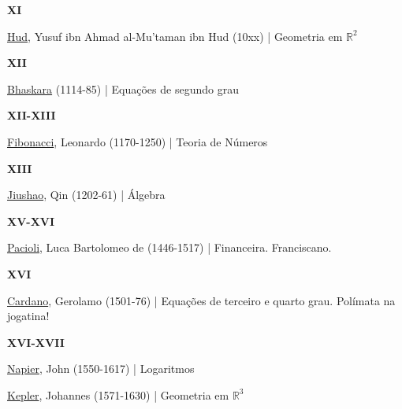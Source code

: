 \documentclass[12pt,a4paper]{article}
\begin{document}
			\textbf{XI}

			\href{http://en.wikipedia.org/wiki/Yusuf_al-Mu\%27taman_ibn_Hud}{Hud}, Yusuf ibn Ahmad al-Mu'taman ibn Hud (10xx) | Geometria em $ \mathbb{R}^2 $

			\begin{flushright}
			\end{flushright}

			\textbf{XII}

			\href{http://pt.wikipedia.org/wiki/Bhaskara}{Bhaskara} (1114-85) | Equa\c{c}\~oes de segundo grau

			\begin{flushright}
			\end{flushright}

			\textbf{XII-XIII}

			\href{http://pt.wikipedia.org/wiki/Leonardo_Fibonacci}{Fibonacci}, Leonardo (1170-1250) | Teoria de N\'umeros

			\begin{flushright}
			\end{flushright}

			\textbf{XIII}

			\href{http://en.wikipedia.org/wiki/Qin_Jiushao}{Jiushao}, Qin (1202-61) | \'Algebra

			\begin{flushright}
			\end{flushright}

			\textbf{XV-XVI}

			\href{http://en.wikipedia.org/wiki/Luca_Pacioli}{Pacioli}, Luca Bartolomeo de (1446-1517) | Financeira. Franciscano.

			\begin{flushright}
			\end{flushright}

			\textbf{XVI}

			\href{http://pt.wikipedia.org/wiki/Girolamo_Cardano}{Cardano}, Gerolamo (1501-76) | Equa\c{c}\~oes de terceiro e quarto grau. Pol\'imata na jogatina!

			\begin{flushright}
			\end{flushright}

			\textbf{XVI-XVII}

			\href{http://pt.wikipedia.org/wiki/John_Napier}{Napier}, John (1550-1617) | Logaritmos

			\href{http://en.wikipedia.org/wiki/Johannes_Kepler}{Kepler}, Johannes (1571-1630) | Geometria em $ \mathbb{R}^3 $
\end{document}
